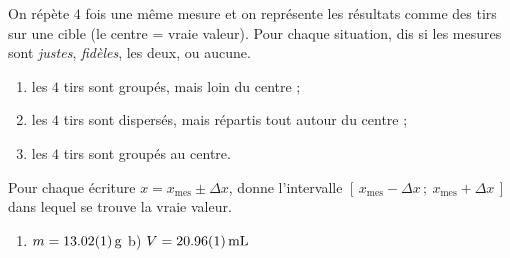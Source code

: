\documentclass[11pt,a4paper]{article}
\begin{document}
\begin{exo}
On répète $4$ fois une même mesure et on représente les résultats comme des tirs sur une cible (le
centre = vraie valeur). Pour chaque situation, dis si les mesures sont \emph{justes}, \emph{fidèles},
les deux, ou aucune.
\begin{enumerate}[label=\alph*),leftmargin=1.6em,itemsep=1pt]
  \item les $4$ tirs sont groupés, mais loin du centre ;
  \item les $4$ tirs sont dispersés, mais répartis tout autour du centre ;
  \item les $4$ tirs sont groupés au centre.
\end{enumerate}
\end{exo}

\begin{exo}
Pour chaque écriture $x = x_{\text{mes}} \pm \Delta x$, donne l'intervalle $[\,x_{\text{mes}}-\Delta x\,;\ x_{\text{mes}}+\Delta x\,]$
dans lequel se trouve la vraie valeur.
\begin{enumerate}[label=\alph*),leftmargin=1.6em,itemsep=1pt]
  \item $m = \qty{13,02\pm0,01}{\gram}$ \qquad b) $V = \qty{20,96\pm0,01}{\milli\litre}$
\end{enumerate}
\end{exo}
\end{document}
